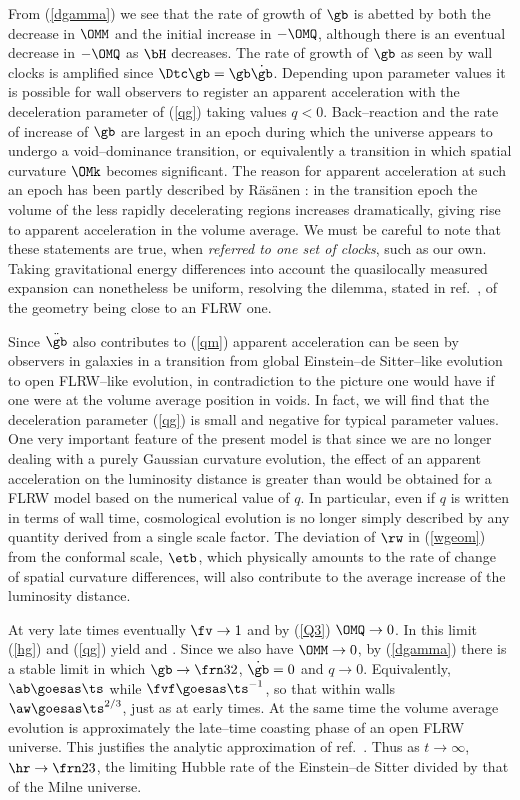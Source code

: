 \documentclass[12pt]{iopart}
\begin{document}
From (\ref{dgamma}) we see that the rate of growth of $\gb$ is abetted by both
the decrease in $\OMM$ and the initial increase in $-\OMQ$, although there
is an eventual decrease in $-\OMQ$ as $\bH$ decreases. The rate of growth of
$\gb$ as seen by
wall clocks is amplified since $\Dtc\gb=\gb\dot\gb$. Depending upon parameter
values it is possible for wall observers to register an apparent
acceleration with the deceleration parameter of (\ref{qg}) taking values
$q<0$. Back--reaction and the rate of increase of $\gb$ are largest in an
epoch during which the universe appears to undergo a void--dominance
transition, or equivalently a transition in which spatial curvature $\OMk$
becomes significant. The reason for apparent acceleration at such an
epoch has been partly described by R\"as\"anen \cite{Ras}: in the
transition epoch the volume of the less rapidly decelerating regions increases
dramatically, giving rise to apparent acceleration in the volume average.
We must be careful to note that these statements are true, when {\em referred
to one set of clocks}, such as our own. Taking gravitational energy
differences into account the quasilocally measured expansion can nonetheless
be uniform, resolving the dilemma, stated in ref.\ \cite{IW}, of the geometry
being close to an FLRW one.

Since $\ddot\gb$ also contributes to
(\ref{qm}) apparent acceleration can be seen by observers in galaxies in a
transition from global Einstein--de Sitter--like evolution to open FLRW--like
evolution, in contradiction to the picture one would have if one were at the
volume average position in voids. In fact, we will find that the deceleration
parameter (\ref{qg}) is small and negative for typical parameter values.
One very important feature of the present model is that since we are no
longer dealing with a purely Gaussian curvature evolution, the effect of an
apparent acceleration on the luminosity distance is greater than would be
obtained for a FLRW model based on the numerical value of $q$. In particular,
even if $q$ is written in terms of wall time, cosmological evolution is no
longer simply described by any quantity derived from a single scale factor.
The deviation of $\rw$ in (\ref{wgeom}) from the conformal scale, $\etb$,
which physically amounts to the rate of change of spatial curvature
differences, will also contribute to the average increase of the luminosity
distance.

At very late times eventually $\fv\to1$ and by (\ref{Q3}) $\OMQ\to0$.
In this limit (\ref{hg}) and (\ref{qg}) yield
\beq
\Hh\simeq\bH{}\label{Hap}
\eeq
and
\beq
\qh{}.\label{Qap}
\eeq
Since we also have $\OMM\to0$, by (\ref{dgamma}) there is a stable limit
in which $\gb\to\frn32$, $\dot\gb=0$ and $q\to0$. Equivalently,
$\ab\goesas\ts$ while $\fvf\goesas\ts^{-1}$, so that within walls
$\aw\goesas\ts^{2/3}$, just as at early times. At the same time the volume
average evolution is approximately the late--time coasting phase of an open
FLRW universe. This justifies the analytic approximation of ref.\
\cite{paper0}. Thus as $t\to\infty$, $\hr\to\frn23$, the limiting
Hubble rate of the Einstein--de Sitter divided by that of the Milne universe.
\end{document}
